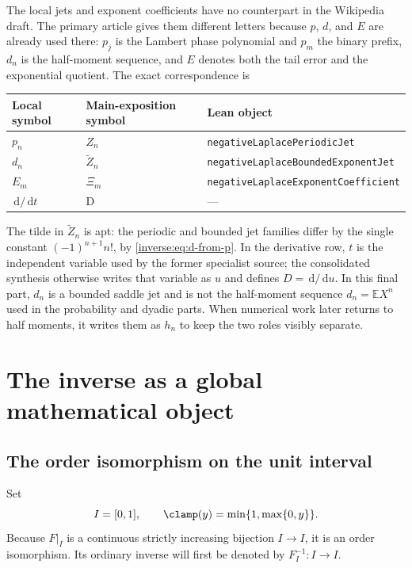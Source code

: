 \documentclass[11pt,oneside]{article}
\theoremstyle{definition}
\theoremstyle{remark}
\newcommand{\dd}{\,\mathrm d}
\newcommand{\E}{\mathbb E}
\begin{document}
The local jets and exponent coefficients have no counterpart in the Wikipedia draft.  The
primary article gives them different letters because \(p\), \(d\), and \(E\) are already
used there: \(p_j\) is the Lambert phase polynomial and \(p_m\) the binary prefix, \(d_n\)
is the half-moment sequence, and \(E\) denotes both the tail error and the exponential
quotient.  The exact correspondence is
\begin{center}
\begin{tabular}{@{}lll@{}}
\toprule
Local symbol & Main-exposition symbol & Lean object \\
\midrule
\(p_n\) & \(Z_n\) & \nolinkurl{negativeLaplacePeriodicJet} \\
\(d_n\) & \(\widetilde Z_n\) & \nolinkurl{negativeLaplaceBoundedExponentJet} \\
\(E_m\) & \(\Xi_m\) & \nolinkurl{negativeLaplaceExponentCoefficient} \\
\(\dd/\dd t\) & \(\mathrm D\) & --- \\
\bottomrule
\end{tabular}
\end{center}

The tilde in \(\widetilde Z_n\) is apt: the periodic and bounded jet families differ by the
single constant \((-1)^{n+1}n!\), by \eqref{inverse:eq:d-from-p}.  In the derivative row,
\(t\) is the independent variable used by the former specialist source; the consolidated
synthesis otherwise writes that variable as \(u\) and defines \(D=\dd/\dd u\).  In this
final part, \(d_n\) is a bounded saddle jet and is not the half-moment sequence
\(d_n=\E X^n\) used in the probability and dyadic parts.  When numerical work later returns
to half moments, it writes them as \(h_n\) to keep the two roles visibly separate.

\section{The inverse as a global mathematical object}
\label{inverse:sec:inverse}

\subsection{The order isomorphism on the unit interval}

Set
\[
 I=[0,1],\qquad
 \clamp(y)=\min\{1,\max\{0,y\}\}.
\]
Because $F|_I$ is a continuous strictly increasing bijection $I\to I$, it
is an order isomorphism.  Its ordinary inverse will first be denoted by
$F_I^{-1}:I\to I$.
\end{document}
